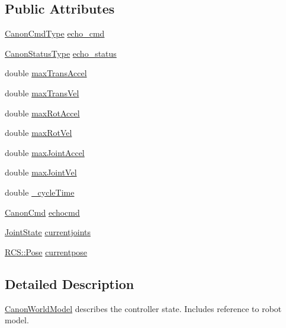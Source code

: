 \subsection*{Public Attributes}
\begin{DoxyCompactItemize}
\item 
\hyperlink{namespaceRCS_a55bbd74afb87a330de1b95af65f4cb75}{Canon\-Cmd\-Type} \hyperlink{structRCS_1_1CanonWorldModel_aed51034c2dd7b1a78722fe7444691132}{echo\-\_\-cmd}
\item 
\hyperlink{namespaceRCS_a0e720341c250145b8a2bbf6a1afa777d}{Canon\-Status\-Type} \hyperlink{structRCS_1_1CanonWorldModel_a59f849abf2987e1745aaf6db68eecb07}{echo\-\_\-status}
\item 
double \hyperlink{structRCS_1_1CanonWorldModel_a9b6d5469341e73289788ba0fe0f3c57a}{max\-Trans\-Accel}
\item 
double \hyperlink{structRCS_1_1CanonWorldModel_a55824e72d1d92c8b5f5c8ecf3b7c7a00}{max\-Trans\-Vel}
\item 
double \hyperlink{structRCS_1_1CanonWorldModel_aca5f8ebce128e94ed4edf3caabb6c363}{max\-Rot\-Accel}
\item 
double \hyperlink{structRCS_1_1CanonWorldModel_acbb472eee22bb4764dc865476fe56950}{max\-Rot\-Vel}
\item 
double \hyperlink{structRCS_1_1CanonWorldModel_ac20eae577122dd6dc58f92f33c1de53c}{max\-Joint\-Accel}
\item 
double \hyperlink{structRCS_1_1CanonWorldModel_a29c9099062e430196fc659fd7ae2f8ef}{max\-Joint\-Vel}
\item 
double \hyperlink{structRCS_1_1CanonWorldModel_a8b14e4665c3491b8a68977dbf84c9479}{\-\_\-cycle\-Time}
\item 
\hyperlink{structRCS_1_1CanonCmd}{Canon\-Cmd} \hyperlink{structRCS_1_1CanonWorldModel_ac7e75df0508ec626b834a77ebfe0465f}{echocmd}
\item 
\hyperlink{RCS_8h_aa4adb93a26caa4dacba9c9614e283245}{Joint\-State} \hyperlink{structRCS_1_1CanonWorldModel_a0060a81cde9ecf9ae02c5e61b8345a5b}{currentjoints}
\item 
\hyperlink{namespaceRCS_aa07e45d8a50e30064283d2b38087f999}{R\-C\-S\-::\-Pose} \hyperlink{structRCS_1_1CanonWorldModel_a7220d95245ac8a787e35efb2cc399cb5}{currentpose}
\end{DoxyCompactItemize}


\subsection{Detailed Description}
\hyperlink{structRCS_1_1CanonWorldModel}{Canon\-World\-Model} describes the controller state. Includes reference to robot model. 

